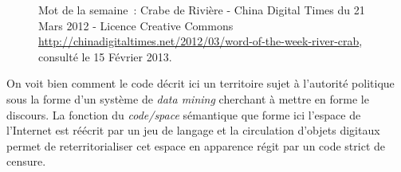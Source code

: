 \begin{figure}[htp]
    \centering
    \hspace{5pt}


    \caption[Hexie]{ Mot de la semaine : Crabe de Rivière - China Digital Times du 21 Mars 2012 - Licence Creative Commons \url{http://chinadigitaltimes.net/2012/03/word-of-the-week-river-crab}, consulté le 15 Février 2013.}

    \label{fig:hexie}
\end{figure}

On voit bien comment le code décrit ici un territoire sujet à l’autorité politique sous la forme d’un système de \textit{data mining} cherchant à mettre en forme le discours. La fonction du \textit{code/space} sémantique que forme ici l’espace de l’Internet est réécrit par un jeu de langage et la circulation d’objets digitaux permet de reterritorialiser cet espace en apparence régit par un code strict de censure. 

